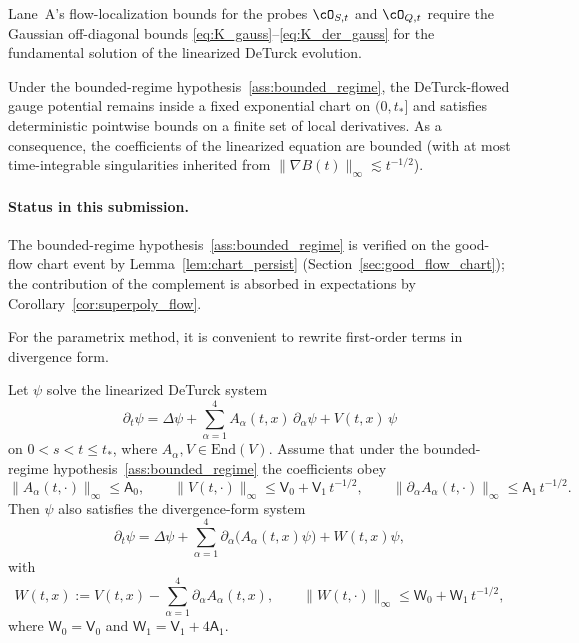 Lane~A's flow-localization bounds for the probes $\cO_{S,t}$ and $\cO_{Q,t}$ require the Gaussian off-diagonal bounds
\eqref{eq:K_gauss}--\eqref{eq:K_der_gauss} for the fundamental solution of the linearized DeTurck evolution.

Under the bounded-regime hypothesis~\ref{ass:bounded_regime}, the DeTurck-flowed gauge potential remains inside a fixed exponential chart on $(0,t_\ast]$
and satisfies deterministic pointwise bounds on a finite set of local derivatives.
As a consequence, the coefficients of the linearized equation are bounded (with at most time-integrable singularities inherited from $\|\nabla B(t)\|_\infty\lesssim t^{-1/2}$).

\paragraph{Status in this submission.}
The bounded-regime hypothesis~\ref{ass:bounded_regime} is verified on the good-flow chart event by Lemma~\ref{lem:chart_persist}
(Section~\ref{sec:good_flow_chart}); the contribution of the complement is absorbed in expectations by Corollary~\ref{cor:superpoly_flow}.

For the parametrix method, it is convenient to rewrite first-order terms in divergence form.

\begin{lemma}\label{lem:div_form_reduction}
Let $\psi$ solve the linearized DeTurck system
\[
\partial_t \psi
=
\Delta \psi + \sum_{\alpha=1}^4 A_\alpha(t,x)\,\partial_\alpha\psi + V(t,x)\,\psi
\]
on $0<s<t\le t_\ast$, where $A_\alpha,V\in \mathrm{End}(V)$.
Assume that under the bounded-regime hypothesis~\ref{ass:bounded_regime} the coefficients obey
\[
\|A_\alpha(t,\cdot)\|_\infty\le \mathsf A_0,\qquad
\|V(t,\cdot)\|_\infty\le \mathsf V_0+\mathsf V_1\,t^{-1/2},
\qquad
\|\partial_\alpha A_\alpha(t,\cdot)\|_\infty\le \mathsf A_1\,t^{-1/2}.
\]
Then $\psi$ also satisfies the divergence-form system
\begin{equation}\label{eq:div_form_lin}
\partial_t \psi
=
\Delta \psi + \sum_{\alpha=1}^4 \partial_\alpha\big(A_\alpha(t,x)\psi\big)+W(t,x)\psi,
\end{equation}
with
\[
W(t,x):=V(t,x)-\sum_{\alpha=1}^4\partial_\alpha A_\alpha(t,x),
\qquad
\|W(t,\cdot)\|_\infty\le \mathsf W_0+\mathsf W_1\,t^{-1/2},
\]
where $\mathsf W_0=\mathsf V_0$ and $\mathsf W_1=\mathsf V_1+4\mathsf A_1$.
\end{lemma}

